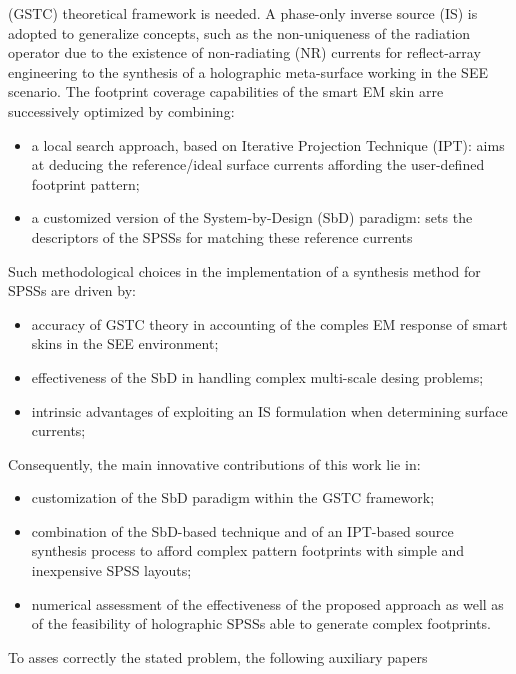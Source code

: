 (GSTC) theoretical framework is needed. A phase-only inverse source (IS) is adopted to generalize concepts, such as the non-uniqueness of the radiation operator due to the existence of non-radiating (NR) currents for reflect-array engineering to the synthesis of a holographic meta-surface working in the SEE scenario. The footprint coverage capabilities of the smart EM skin arre successively optimized by combining:
\begin{itemize}
\item a local search approach, based on Iterative Projection Technique (IPT): aims at deducing the reference/ideal surface currents affording the user-defined footprint pattern;
\item a customized version of the System-by-Design (SbD) paradigm: sets the descriptors of the SPSSs for matching these reference currents
\end{itemize}
Such methodological choices in the implementation of a synthesis method for SPSSs are driven by:
\begin{itemize}
\item accuracy of GSTC theory in accounting of the comples EM response of smart skins in the SEE environment;
\item effectiveness of the SbD in handling complex multi-scale desing problems;
\item intrinsic advantages of exploiting an IS formulation when determining surface currents;
\end{itemize}
Consequently, the main innovative contributions of this work lie in:
\begin{itemize}
\item customization of the SbD paradigm within the GSTC framework;
\item combination of the SbD-based technique and of an IPT-based source synthesis process to afford complex pattern footprints with simple and inexpensive SPSS layouts;
\item numerical assessment of the effectiveness of the proposed approach as well as of the feasibility of holographic SPSSs able to generate complex footprints.
\end{itemize}
To asses correctly the stated problem, the following auxiliary papers
\begin{table}[H]
\centering
{} 
\end{table}
